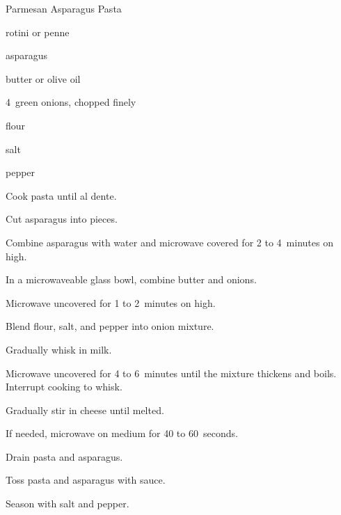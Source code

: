 \begin{recipe}{Parmesan Asparagus Pasta}{}{}

\begin{ingredients}
\item {} rotini or penne
\item \lbs{\half} asparagus
\item {} butter or olive oil
\item 4~green onions, chopped finely
\item {} flour
\item salt
\item pepper
\item \C{1\half} 
\item {} 
\end{ingredients}

\begin{directions}
\item Cook pasta until al dente.
\item Cut asparagus into \inch{\half} pieces.
\item Combine asparagus with  water and microwave covered for 2 to 4~minutes on high.
\item In a  microwaveable glass bowl, combine butter and onions.
\item Microwave uncovered for 1 to 2~minutes on high.
\item Blend flour, salt, and pepper into onion mixture.
\item Gradually whisk in milk.
\item Microwave uncovered for 4 to 6~minutes until the mixture thickens and boils. Interrupt cooking to whisk.
\item Gradually stir in cheese until melted.
\item If needed, microwave on medium for 40 to 60~seconds.
\item Drain pasta and asparagus.
\item Toss pasta and asparagus with sauce.
\item Season with salt and pepper.
\end{directions}

\end{recipe}
